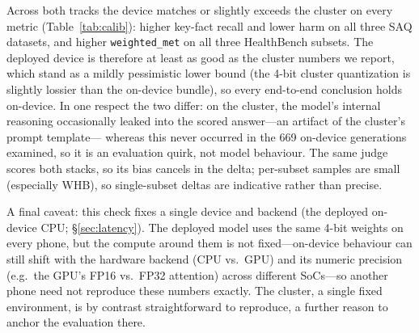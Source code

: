 Across both tracks the device matches or slightly exceeds the cluster on
every metric (Table~\ref{tab:calib}): higher key-fact recall and lower harm
on all three SAQ datasets, and higher \texttt{weighted\_met} on all three
HealthBench subsets. The deployed device is therefore at least as good as the
cluster numbers we report, which stand as a mildly pessimistic lower bound
(the 4-bit cluster quantization is slightly lossier than the on-device
bundle), so every end-to-end conclusion holds on-device. In one respect the two
differ: on the cluster, the model's internal reasoning occasionally leaked
into the scored answer---an artifact of the cluster's prompt template---
whereas this never occurred in the 669 on-device generations examined, so it is an
evaluation quirk, not model behaviour. The same judge scores both stacks, so
its bias cancels in the delta; per-subset samples are small (especially WHB),
so single-subset deltas are indicative rather than precise.

A final caveat: this check fixes a single device and backend (the deployed
on-device CPU; \S\ref{sec:latency}). The deployed model uses the same 4-bit weights on
every phone, but the compute around them is not fixed---on-device behaviour
can still shift with the hardware backend (CPU vs.\ GPU) and its numeric
precision (e.g.\ the GPU's FP16 vs.\ FP32 attention) across different
SoCs---so another phone need not reproduce these numbers exactly. The
cluster, a single fixed environment, is by contrast straightforward to
reproduce, a further reason to anchor the evaluation there.
